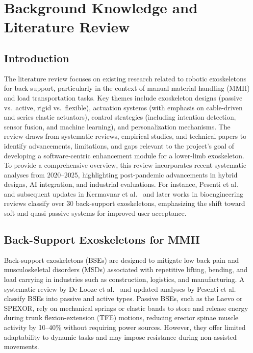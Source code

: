 \chapter{Background Knowledge and Literature Review}

\section{Introduction}
The literature review focuses on existing research related to robotic exoskeletons for back support, particularly in the context of manual material handling (MMH) and load transportation tasks. Key themes include exoskeleton designs (passive vs.\ active, rigid vs.\ flexible), actuation systems (with emphasis on cable-driven and series elastic actuators), control strategies (including intention detection, sensor fusion, and machine learning), and personalization mechanisms. The review draws from systematic reviews, empirical studies, and technical papers to identify advancements, limitations, and gaps relevant to the project's goal of developing a software-centric enhancement module for a lower-limb exoskeleton. To provide a comprehensive overview, this review incorporates recent systematic analyses from 2020--2025, highlighting post-pandemic advancements in hybrid designs, AI integration, and industrial evaluations. For instance, Pesenti et al.~\cite{pesenti2021} and subsequent updates in Kermavnar et al.~\cite{kermavnar2021} and later works in bioengineering reviews classify over 30 back-support exoskeletons, emphasizing the shift toward soft and quasi-passive systems for improved user acceptance.

\section[Overview of back-support exoskeletons for MMH]{Back-Support Exoskeletons for MMH}
Back-support exoskeletons (BSEs) are designed to mitigate low back pain and musculoskeletal disorders (MSDs) associated with repetitive lifting, bending, and load carrying in industries such as construction, logistics, and manufacturing. A systematic review by De Looze et al.~\cite{delooze2016} and updated analyses by Pesenti et al.~\cite{pesenti2021} classify BSEs into passive and active types. Passive BSEs, such as the Laevo or SPEXOR, rely on mechanical springs or elastic bands to store and release energy during trunk flexion-extension (TFE) motions, reducing erector spinae muscle activity by 10--40\% without requiring power sources. However, they offer limited adaptability to dynamic tasks and may impose resistance during non-assisted movements.

